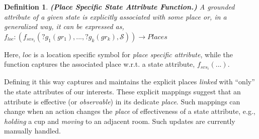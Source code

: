 \documentclass[letterpaper]{article} %
\newtheorem{definition}{Definition}
\begin{document}


\begin{definition}
    \textbf{(Place Specific State Attribute Function.)} A 
    {\em grounded} 
    attribute of a given state is explicitly associated with some {\em place}
    or, in a generalized way, it can be expressed as, 
    $f_{loc}: (f_{svs_i}(?g_1(gr_1),...,?g_k(gr_k),\mathcal{S})) \rightarrow Places$
    \label{def:pssav}
\end{definition}
Here, $\mathit{loc}$ is a location specific symbol for {\em place specific attribute}, while the function captures the associated place w.r.t. a state attribute, $f_{svs_i}(...)$.

Defining it this way captures and maintains the explicit places \textit{linked} with ``only'' the state attributes of our interests. 
These explicit mappings suggest that an attribute is effective (or \textit{observable}) in its dedicate \textit{place}.
Such mappings can change when an action changes the \textit{place} of effectiveness of a state attribute, e.g., 
\textit{holding} a cup and \textit{moving} to an adjacent room. Such updates are currently manually handled.
\end{document}
